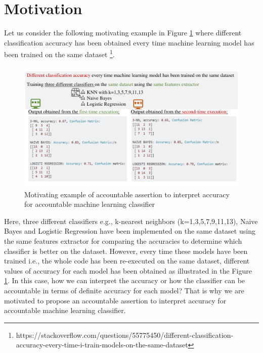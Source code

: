 \section{Motivation}
\label{sec:motivation}

Let us consider the following motivating example in Figure \ref{fig:motiv} where different classification accuracy has been obtained every time machine learning model has been trained on the same dataset  \footnote{https://stackoverflow.com/questions/55775450/different-classification-accuracy-every-time-i-train-models-on-the-same-dataset}. 
\begin{figure}[h]
	\includegraphics[width=\linewidth]{motivfigure.pdf}
	\caption{Motivating example of accountable assertion to interpret accuracy for accountable machine learning classifier}
	\label{fig:motiv}
\end{figure}
Here, three different classifiers e.g., k-nearest neighbors (k=1,3,5,7,9,11,13), Naive Bayes and Logistic Regression have been implemented on the same dataset using the same features extractor for comparing the accuracies to determine which classifier is better on the dataset. However, every time these models have been trained i.e., the whole code has been re-executed on the same dataset, different values of accuracy for each model has been obtained as illustrated in the Figure \ref{fig:motiv}. In this case, how we can interpret the accuracy or how the classifier can be accountable in terms of definite accuracy for each model? That is why we are motivated to propose an accountable assertion to interpret accuracy for accountable machine learning classifier.  



